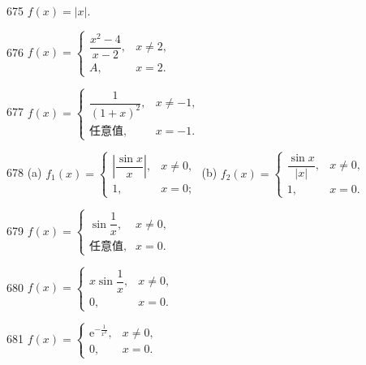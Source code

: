 
\begin{prob}[M]{675}
$f(x) = |x|$.
\end{prob}

\begin{prob}[M]{676}
$f(x) = \begin{cases} \dfrac{x^2 - 4}{x - 2}, & x \neq 2, \\ A, & x = 2. \end{cases}$
\end{prob}

\begin{prob}[M]{677}
$f(x) = \begin{cases} \dfrac{1}{(1 + x)^2}, & x \neq -1, \\ \text{任意值}, & x = -1. \end{cases}$
\end{prob}

\begin{prob}[M]{678}
(a) $f_1(x) = \begin{cases} \left|\dfrac{\sin x}{x}\right|, & x \neq 0, \\ 1, & x = 0; \end{cases}$ \qquad (b) $f_2(x) = \begin{cases} \dfrac{\sin x}{|x|}, & x \neq 0, \\ 1, & x = 0. \end{cases}$
\end{prob}

\begin{prob}[M]{679}
$f(x) = \begin{cases} \sin\dfrac{1}{x}, & x \neq 0, \\ \text{任意值}, & x = 0. \end{cases}$
\end{prob}

\begin{prob}[M]{680}
$f(x) = \begin{cases} x\sin\dfrac{1}{x}, & x \neq 0, \\ 0, & x = 0. \end{cases}$
\end{prob}

\begin{prob}[M]{681}
$f(x) = \begin{cases} \mathrm{e}^{-\frac{1}{x^2}}, & x \neq 0, \\ 0, & x = 0. \end{cases}$
\end{prob}

